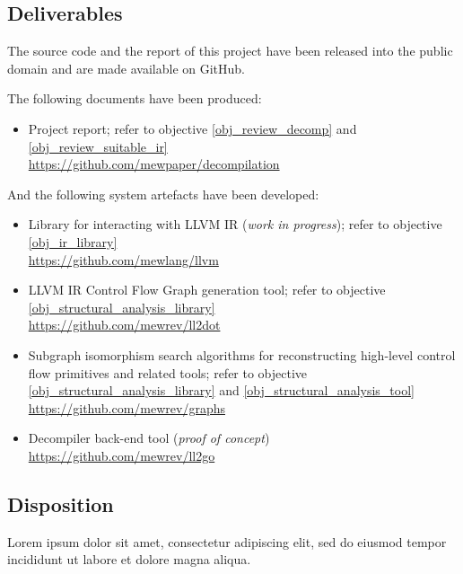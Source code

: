 \documentclass[12pt, a4paper]{article}
\begin{document}

\subsection{Deliverables}

The source code and the report of this project have been released into the public domain \cite{cc0} and are made available on GitHub.

The following documents have been produced:
\begin{itemize}
	\item Project report; refer to objective \ref{obj_review_decomp} and \ref{obj_review_suitable_ir} \\ \url{https://github.com/mewpaper/decompilation}
\end{itemize}

And the following system artefacts have been developed:
\begin{itemize}
	\item Library for interacting with LLVM IR (\textit{work in progress}); refer to objective \ref{obj_ir_library} \\ \url{https://github.com/mewlang/llvm}
	\item LLVM IR Control Flow Graph generation tool; refer to objective \ref{obj_structural_analysis_library} \\ \url{https://github.com/mewrev/ll2dot}
	\item Subgraph isomorphism search algorithms for reconstructing high-level control flow primitives and related tools; refer to objective \ref{obj_structural_analysis_library} and \ref{obj_structural_analysis_tool} \\ \url{https://github.com/mewrev/graphs}
	\item Decompiler back-end tool (\textit{proof of concept}) \\ \url{https://github.com/mewrev/ll2go}
\end{itemize}


\subsection{Disposition}

Lorem ipsum dolor sit amet, consectetur adipiscing elit, sed do eiusmod tempor incididunt ut labore et dolore magna aliqua.
\end{document}
